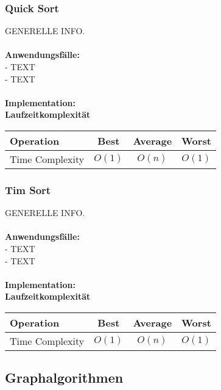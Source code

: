 \documentclass[../main.tex]{subfiles}
\begin{document}
	\subsubsection{Quick Sort}
	GENERELLE INFO. \\\\
	\textbf{Anwendungsfälle:}\\
	- TEXT\\
	- TEXT\\\\
	\textbf{Implementation:}\\
	 
	\textbf{Laufzeitkomplexität}\\
	\begin{table}[ht]
		\centering
		\begin{tabular}{l *{3}{c}}
			\toprule
			Operation & Best & Average & Worst\\
			\midrule
			Time Complexity & $O(1)$ & $O(n)$ & $O(1)$\\
			\bottomrule
		\end{tabular}
	\end{table}
	\clearpage
	
		\subsubsection{Tim Sort}
	GENERELLE INFO. \\\\
	\textbf{Anwendungsfälle:}\\
	- TEXT\\
	- TEXT\\\\
	\textbf{Implementation:}\\
	 
	\textbf{Laufzeitkomplexität}\\
	\begin{table}[ht]
		\centering
		\begin{tabular}{l *{3}{c}}
			\toprule
			Operation & Best & Average & Worst\\
			\midrule
			Time Complexity & $O(1)$ & $O(n)$ & $O(1)$\\
			\bottomrule
		\end{tabular}
	\end{table}
	\clearpage
	
	\subsection{Graphalgorithmen}
\end{document}
